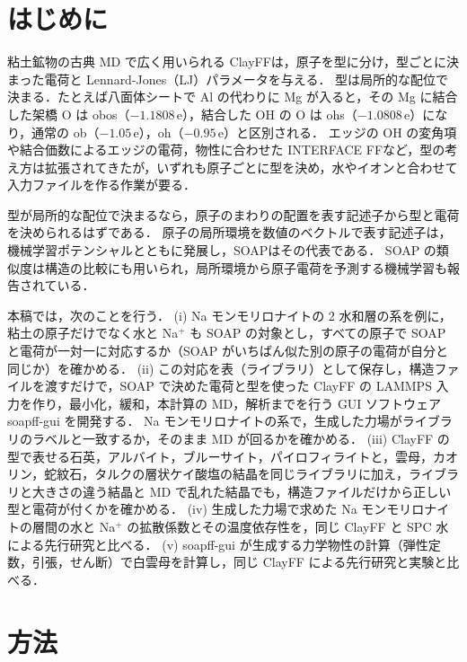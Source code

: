 \documentclass[a4paper,11pt]{article}
\newcommand{\e}{\,e}
\begin{document}
\section{はじめに}
粘土鉱物の古典 MD で広く用いられる ClayFF\cite{cygan2004,cygan2021}は，原子を型に分け，型ごとに決まった電荷と Lennard-Jones（LJ）パラメータを与える．
型は局所的な配位で決まる．たとえば八面体シートで Al の代わりに Mg が入ると，その Mg に結合した架橋 O は obos（$-1.1808$\e），結合した OH の O は ohs（$-1.0808$\e）になり，通常の ob（$-1.05$\e），oh（$-0.95$\e）と区別される．
エッジの OH の変角項\cite{pouvreau2017}や結合価数によるエッジの電荷\cite{lammers2017}，物性に合わせた INTERFACE FF\cite{heinz2013}など，型の考え方は拡張されてきたが，いずれも原子ごとに型を決め，水やイオンと合わせて入力ファイルを作る作業が要る．

型が局所的な配位で決まるなら，原子のまわりの配置を表す記述子から型と電荷を決められるはずである．
原子の局所環境を数値のベクトルで表す記述子は，機械学習ポテンシャル\cite{behler2007,bartok2010}とともに発展し，SOAP\cite{bartok2013}はその代表である\cite{willatt2019,musil2021,langer2022}．
SOAP の類似度は構造の比較にも用いられ\cite{de2016}，局所環境から原子電荷を予測する機械学習も報告されている\cite{kancharlapalli2021,raza2020}．

本稿では，次のことを行う．
(i) Na モンモリロナイトの 2 水和層の系を例に，粘土の原子だけでなく水と Na$^+$ も SOAP の対象とし，すべての原子で SOAP と電荷が一対一に対応するか（SOAP がいちばん似た別の原子の電荷が自分と同じか）を確かめる．
(ii) この対応を表（ライブラリ）として保存し，構造ファイルを渡すだけで，SOAP で決めた電荷と型を使った ClayFF の LAMMPS 入力を作り，最小化，緩和，本計算の MD，解析までを行う GUI ソフトウェア soapff-gui を開発する．
Na モンモリロナイトの系で，生成した力場がライブラリのラベルと一致するか，そのまま MD が回るかを確かめる．
(iii) ClayFF の型で表せる石英，アルバイト，ブルーサイト，パイロフィライトと，雲母，カオリン，蛇紋石，タルクの層状ケイ酸塩の結晶を同じライブラリに加え，ライブラリと大きさの違う結晶と MD で乱れた結晶でも，構造ファイルだけから正しい型と電荷が付くかを確かめる．
(iv) 生成した力場で求めた Na モンモリロナイトの層間の水と Na$^+$ の拡散係数とその温度依存性を，同じ ClayFF と SPC 水による先行研究\cite{greathouse2016}と比べる．
(v) soapff-gui が生成する力学物性の計算（弾性定数，引張，せん断）で白雲母を計算し，同じ ClayFF による先行研究\cite{teich2012,delrio2026}と実験\cite{vaughan1986}と比べる．

\section{方法}
\end{document}
